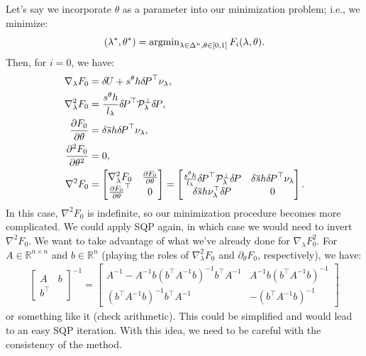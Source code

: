 \documentclass[eikonal.tex]{subfiles}
\begin{document}
Let's say we incorporate $\theta$ as a parameter into our minimization
problem; i.e., we minimize:
\begin{equation}
  (\lambda^*, \theta^*) = \operatorname{argmin}_{\lambda \in \Delta^n, \theta \in [0, 1]} F_i(\lambda, \theta).
\end{equation}
Then, for $i = 0$, we have:
\begin{align*}
  \nabla_\lambda F_0 &= {\delta \hspace{-0.09em} U} + s^\theta h {\delta \hspace{-0.14em} P}^\top \nu_\lambda, \\
  \nabla_\lambda^2 F_0 &= \frac{s^\theta h}{l_\lambda} {\delta \hspace{-0.14em} P}^\top \mathcal{P}_\lambda^\perp {\delta \hspace{-0.14em} P}, \\
  \frac{\partial F_0}{\partial \theta} &= \delta \overline{s} h {\delta \hspace{-0.14em} P}^\top \nu_\lambda, \\
  \frac{\partial^2 F_0}{\partial \theta^2} &= 0, \\
  \nabla^2 F_0 &= \begin{bmatrix}
    \nabla_\lambda^2 F_0 & \frac{\partial F_0}{\partial \theta} \\
    \frac{\partial F_0}{\partial \theta}^\top & 0
  \end{bmatrix} = \begin{bmatrix}
    \frac{s^\theta h}{l_\lambda} {\delta \hspace{-0.14em} P}^\top \mathcal{P}_\lambda^\perp {\delta \hspace{-0.14em} P} & \delta \overline{s} h {\delta \hspace{-0.14em} P}^\top \nu_\lambda \\
    \delta \overline{s} h \nu_\lambda^\top {\delta \hspace{-0.14em} P}  & 0
  \end{bmatrix}.
\end{align*}
In this case, $\nabla^2 F_0$ is indefinite, so our minimization
procedure becomes more complicated. We could apply SQP again, in which
case we would need to invert $\nabla^2 F_0$. We want to take advantage
of what we've already done for $\nabla_\lambda F_0^2$. For
$A \in \mathbb{R}^{n \times n}$ and $b \in \mathbb{R}^{n}$ (playing
the roles of $\nabla_\lambda^2 F_0$ and $\partial_\theta F_0$,
respectively), we have:
\begin{align*}
  \begin{bmatrix}
    A & b \\
    b^\top &
  \end{bmatrix}^{-1} = \begin{bmatrix}
    A^{-1} - A^{-1} b (b^\top A^{-1} b)^{-1} b^\top A^{-1} & A^{-1} b (b^\top A^{-1} b)^{-1} \\
    (b^\top A^{-1} b)^{-1} b^\top A^{-1} & -(b^\top A^{-1} b)^{-1}
  \end{bmatrix}
\end{align*}
or something like it (check arithmetic). This could be simplified and
would lead to an easy SQP iteration. With this idea, we need to be
careful with the consistency of the method.
\end{document}
